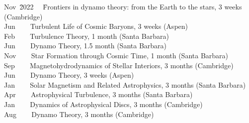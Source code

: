 \documentclass{article}
\begin{document}
\begin{tabbing}
Nov~\= 2022 ~~\= Frontiers in dynamo theory: from the Earth to the stars, 3 weeks (Cambridge) \\
Jun~ ~~\> Turbulent Life of Cosmic Baryons, 3 weeks (Aspen) \\
Feb~ ~~\> Turbulence Theory, 1 month (Santa Barbara) \\
Jun~ ~~\> Dynamo Theory, 1.5 month (Santa Barbara) \\
Nov~ ~~\> Star Formation through Cosmic Time, 1 month (Santa Barbara) \\
Sep~ ~~\> Magnetohydrodynamics of Stellar Interiors, 3 months (Cambridge) \\
Jun~ ~~\> Dynamo Theory, 3 weeks (Aspen) \\
Jan~ ~~\> Solar Magnetism and Related Astrophysics, 3 months (Santa Barbara) \\
Apr~ ~~\> Astrophysical Turbulence, 3 months (Santa Barbara) \\
Jan~ ~~\> Dynamics of Astrophysical Discs, 3 months (Cambridge) \\
Aug~ ~~\> Dynamo Theory, 3 months (Cambridge) \\
\end{tabbing}
\vspace{-8mm}



\end{document}
